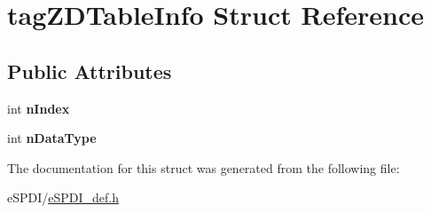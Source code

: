 \hypertarget{structtag_z_d_table_info}{}\section{tag\+Z\+D\+Table\+Info Struct Reference}
\label{structtag_z_d_table_info}
\subsection*{Public Attributes}
\begin{DoxyCompactItemize}
\item 
\mbox{\label{structtag_z_d_table_info_a6a777fc5f8c7593a394fd9ae89e91cdf}} 
int {\bfseries n\+Index}
\item 
\mbox{\label{structtag_z_d_table_info_a0fb2c5c0d70370bb454f9d00505af28c}} 
int {\bfseries n\+Data\+Type}
\end{DoxyCompactItemize}


The documentation for this struct was generated from the following file\+:\begin{DoxyCompactItemize}
\item 
e\+S\+P\+D\+I/\hyperlink{e_s_p_d_i__def_8h}{e\+S\+P\+D\+I\+\_\+def.\+h}\end{DoxyCompactItemize}
